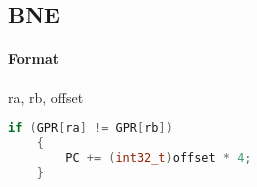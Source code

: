 \subsection{BNE}


\paragraph{Format} ra, rb, offset

\begin{lstlisting}[language=c]
    if (GPR[ra] != GPR[rb])
    {
        PC += (int32_t)offset * 4;
    }
\end{lstlisting}

